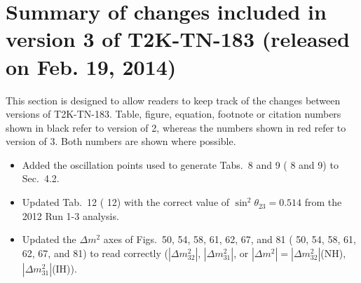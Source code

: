 \section{Summary of changes included in version 3 of T2K-TN-183 (released on Feb. 19, 2014)}

This section is designed to allow readers to keep track of the changes between versions of T2K-TN-183.
Table, figure, equation, footnote or citation numbers shown in black refer to version of 2,
{\color{red}whereas the numbers shown in red refer to version of 3}.
Both numbers are shown where possible.

\begin{itemize}

\item Added the oscillation points used to generate Tabs.\ 8 and 9 ({\color{red} 8 and 9}) to Sec.\ 4.2.
  

  
\item Updated Tab.\ 12 ({\color{red} 12}) with the correct value of $\sin^2\theta_{23}=0.514$ from the 2012 Run 1-3 analysis.

\item Updated the $\Delta m^2$ axes of Figs.\ 50, 54, 58, 61, 62, 67, and 81 ({\color{red} 50, 54, 58, 61, 62, 67, and 81}) to read correctly
  ($|\Delta m^2_{32}|$, $|\Delta m^2_{31}|$, or $|\Delta m^2| = |\Delta m^2_{32}|$(NH), $|\Delta m^2_{31}|$(IH)).

  
  
\end{itemize}





